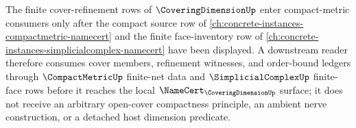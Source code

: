 The finite cover-refinement rows of $\CoveringDimensionUp$ enter compact-metric consumers only after the compact source row of \autoref{ch:concrete-instances-compactmetric-namecert} and the finite face-inventory row of \autoref{ch:concrete-instances-simplicialcomplex-namecert} have been displayed. A downstream reader therefore consumes cover members, refinement witnesses, and order-bound ledgers through $\CompactMetricUp$ finite-net data and $\SimplicialComplexUp$ finite-face rows before it reaches the local $\NameCert_{\CoveringDimensionUp}$ surface; it does not receive an arbitrary open-cover compactness principle, an ambient nerve construction, or a detached host dimension predicate.
